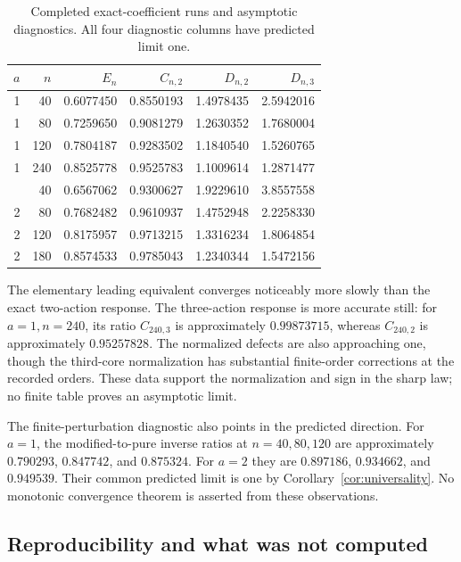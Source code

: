 \documentclass[11pt,a4paper]{article}
\numberwithin{equation}{section}
\theoremstyle{definition}
\theoremstyle{remark}
\begin{document}
\begin{table}[htbp]
\centering\small
\caption{Completed exact-coefficient runs and asymptotic diagnostics.
All four diagnostic columns have predicted limit one.}
\label{tab:diagnostics}
\begin{tabular}{rrrrrr}
\toprule
$a$ & $n$ & $E_n$ & $C_{n,2}$ & $D_{n,2}$ & $D_{n,3}$\\
\midrule
1 & 40 & 0.6077450 & 0.8550193 & 1.4978435 & 2.5942016 \\
1 & 80 & 0.7259650 & 0.9081279 & 1.2630352 & 1.7680004 \\
1 & 120 & 0.7804187 & 0.9283502 & 1.1840540 & 1.5260765 \\
1 & 240 & 0.8525778 & 0.9525783 & 1.1009614 & 1.2871477 \\
\addlinespace
2 & 40 & 0.6567062 & 0.9300627 & 1.9229610 & 3.8557558 \\
2 & 80 & 0.7682482 & 0.9610937 & 1.4752948 & 2.2258330 \\
2 & 120 & 0.8175957 & 0.9713215 & 1.3316234 & 1.8064854 \\
2 & 180 & 0.8574533 & 0.9785043 & 1.2340344 & 1.5472156 \\
\bottomrule
\end{tabular}
\end{table}

The elementary leading equivalent converges noticeably more slowly than
the exact two-action response. The three-action response is more accurate
still: for $a=1,n=240$, its ratio $C_{240,3}$ is approximately
$0.99873715$, whereas $C_{240,2}$ is approximately $0.95257828$.
The normalized defects are also approaching one, though the third-core
normalization has substantial finite-order corrections at the recorded
orders. These data support the normalization and sign in the sharp law;
no finite table proves an asymptotic limit.

The finite-perturbation diagnostic also points in the predicted direction.
For $a=1$, the modified-to-pure inverse ratios at $n=40,80,120$ are
approximately $0.790293$, $0.847742$, and $0.875324$. For $a=2$ they are
$0.897186$, $0.934662$, and $0.949539$. Their common predicted limit is
one by Corollary~\ref{cor:universality}. No monotonic convergence theorem
is asserted from these observations.

\subsection{Reproducibility and what was not computed}
\end{document}

